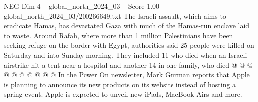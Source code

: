 \begin{textsample}{NEG Dim 4 – global\_north\_2024\_03 – Score 1.00 – global\_north\_2024\_03/200266649.txt}
The Israeli assault, which aims to eradicate Hamas, has devastated Gaza with much of the Hamas-run enclave laid to waste.
Around Rafah, where more than 1 million Palestinians have been seeking refuge on the border with Egypt, authorities said 25 people were killed on Saturday and into Sunday morning.
They included 11 who died when an Israeli airstrike hit a tent near a hospital and another 14 in one family, who died @ @ @ @ @ @ @ @ @ @ In the Power On newsletter, Mark Gurman reports that Apple is planning to announce its new products on its website instead of hosting a spring event.
Apple is expected to unveil new iPads, MacBook Airs and more.

\end{textsample}
